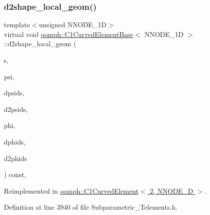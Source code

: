 \mbox{\label{classoomph_1_1C1CurvedElementBase_abafd0a405e40d018020dbffe49cf7258}} 
\subsubsection{\texorpdfstring{d2shape\+\_\+local\+\_\+geom()}{d2shape\_local\_geom()}}
{\footnotesize\ttfamily template$<$unsigned N\+N\+O\+D\+E\+\_\+1D$>$ \\
virtual void \hyperlink{classoomph_1_1C1CurvedElementBase}{oomph\+::\+C1\+Curved\+Element\+Base}$<$ N\+N\+O\+D\+E\+\_\+1D $>$\+::d2shape\+\_\+local\+\_\+geom (\begin{DoxyParamCaption}\item[{const \hyperlink{classoomph_1_1Vector}{Vector}$<$ double $>$ \&}]{s,  }\item[{\hyperlink{classoomph_1_1Shape}{Shape} \&}]{psi,  }\item[{\hyperlink{classoomph_1_1DShape}{D\+Shape} \&}]{dpsids,  }\item[{\hyperlink{classoomph_1_1DShape}{D\+Shape} \&}]{d2psids,  }\item[{\hyperlink{classoomph_1_1Shape}{Shape} \&}]{phi,  }\item[{\hyperlink{classoomph_1_1DShape}{D\+Shape} \&}]{dphids,  }\item[{\hyperlink{classoomph_1_1DShape}{D\+Shape} \&}]{d2phids }\end{DoxyParamCaption}) const\hspace{0.3cm}{\ttfamily [inline]}, {\ttfamily [virtual]}}



Reimplemented in \hyperlink{classoomph_1_1C1CurvedElement_3_012_00_01NNODE__1D_01_4_a075b64b7a480cf9839ae308764c5f355}{oomph\+::\+C1\+Curved\+Element$<$ 2, N\+N\+O\+D\+E\+\_\+D $>$}.



Definition at line 3940 of file Subparametric\+\_\+\+Telements.\+h.

\mbox{\label{classoomph_1_1C1CurvedElementBase_aedb2b90914f244cd86b2565a658cb9eb}} 
